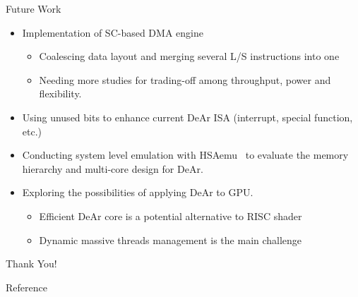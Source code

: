 \documentclass{beamer}
\begin{document}
\begin{CJK}{UTF8}{bkai}
            \begin{frame}{Future Work}
                \begin{itemize}
                    \item <2->{Implementation of SC-based DMA engine
                            \begin{itemize}
                                \item Coalescing data layout and merging several L/S instructions into one
                                \item Needing more studies for trading-off among throughput, power and flexibility. 
                            \end{itemize}
                        }
                    \item <3->{Using unused bits to enhance current DeAr ISA (interrupt, special function, etc.)}
                    \item <4->{Conducting system level emulation with HSAemu~ to evaluate the memory hierarchy and multi-core design for DeAr.}
                    \item <5->{Exploring the possibilities of applying DeAr to GPU.
                            \begin{itemize}
                                \item Efficient DeAr core is a potential alternative to RISC shader
                                \item Dynamic massive threads management is the main challenge
                            \end{itemize}
                        }
                \end{itemize}

            \end{frame}

            \begin{frame}[plain,c]
                \begin{center}
                \Huge{Thank You!}
                \end{center}
            \end{frame}

            \begin{frame}[allowframebreaks]{Reference}
                \printbibliography
            \end{frame}


        \end{CJK}
        
\end{document}
